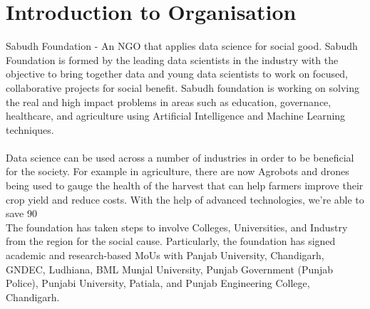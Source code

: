 \chapter{Introduction to Organisation}
\label{Chapter:1}
% 

Sabudh Foundation - An NGO that applies data science for social good. Sabudh Foundation is formed by the leading data scientists in the industry with the objective to bring together data and young data scientists to work on focused, collaborative projects for social benefit.  Sabudh foundation is working on solving the real and high impact problems in areas such as education, governance, healthcare, and agriculture using Artificial Intelligence and Machine Learning techniques.\\
\\
Data science can be used across a number of industries in order to be beneficial for the society. For example in agriculture, there are now Agrobots and drones being used to gauge the health of the harvest that can help farmers improve their crop yield and reduce costs. With the help of advanced technologies, we’re able to save 90%
\\
 The foundation has taken steps to involve Colleges, Universities, and Industry from the region for the social cause. Particularly, the foundation has signed academic and research-based MoUs with Panjab University, Chandigarh,  GNDEC, Ludhiana, BML Munjal University, Punjab Government (Punjab Police), Punjabi University, Patiala,  and Punjab Engineering College, Chandigarh.